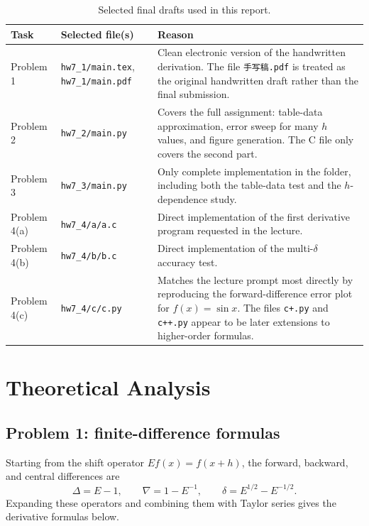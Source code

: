 \documentclass[12pt,a4paper]{article}
\begin{document}
\begin{table}[H]
\centering
\caption{Selected final drafts used in this report.}
\label{tab:selected}
\begin{tabular}{>{\raggedright\arraybackslash}p{} >{\raggedright\arraybackslash}p{} >{\raggedright\arraybackslash}p{}}
\toprule
Task & Selected file(s) & Reason \\
\midrule
Problem 1 & \texttt{hw7\_1/main.tex}, \texttt{hw7\_1/main.pdf} & Clean electronic version of the handwritten derivation. The file \texttt{手写稿.pdf} is treated as the original handwritten draft rather than the final submission. \\
Problem 2 & \texttt{hw7\_2/main.py} & Covers the full assignment: table-data approximation, error sweep for many $h$ values, and figure generation. The C file only covers the second part. \\
Problem 3 & \texttt{hw7\_3/main.py} & Only complete implementation in the folder, including both the table-data test and the $h$-dependence study. \\
Problem 4(a) & \texttt{hw7\_4/a/a.c} & Direct implementation of the first derivative program requested in the lecture. \\
Problem 4(b) & \texttt{hw7\_4/b/b.c} & Direct implementation of the multi-$\delta$ accuracy test. \\
Problem 4(c) & \texttt{hw7\_4/c/c.py} & Matches the lecture prompt most directly by reproducing the forward-difference error plot for $f(x)=\sin x$. The files \texttt{c+.py} and \texttt{c++.py} appear to be later extensions to higher-order formulas. \\
\bottomrule
\end{tabular}
\end{table}

\section{Theoretical Analysis}

\subsection{Problem 1: finite-difference formulas}

Starting from the shift operator $E f(x)=f(x+h)$, the forward, backward, and central differences are
\[
\Delta = E-1, \qquad \nabla = 1-E^{-1}, \qquad \delta = E^{1/2}-E^{-1/2}.
\]
Expanding these operators and combining them with Taylor series gives the derivative formulas below.
\end{document}
